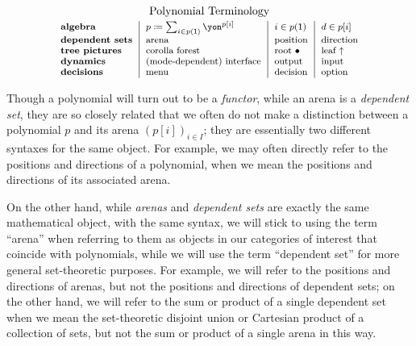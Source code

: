 \documentclass[Book-Poly]{subfiles}
\begin{document}
\begin{equation}%
\footnotesize
\begin{tabular}{l|l|l|l}
\multicolumn{4}{c}{\normalsize Polynomial Terminology}\\[3pt]
\textbf{algebra} & $p \coloneqq \sum_{i \in p(\1)} \yon^{p[i]}$ & $i \in p(\1)$ & $d \in p[i]$ \\
\textbf{dependent sets} & arena & position & direction \\
\textbf{tree pictures} & corolla forest & root $\bullet$ & leaf $\uparrow$ \\
\textbf{dynamics} & (mode-dependent) interface & output & input \\
\textbf{decisions} & menu & decision & option \\
\end{tabular}
\end{equation}

\begin{remark}
Though a polynomial will turn out to be a \emph{functor}, while an arena is a \emph{dependent set}, they are so closely related that we often do not make a distinction between a polynomial $p$ and its arena $(p[i])_{i \in I}$; they are essentially two different syntaxes for the same object.
For example, we may often directly refer to the positions and directions of a polynomial, when we mean the positions and directions of its associated arena.

On the other hand, while \emph{arenas} and \emph{dependent sets} are exactly the same mathematical object, with the same syntax, we will stick to using the term ``arena'' when referring to them as objects in our categories of interest that coincide with polynomials, while we will use the term ``dependent set'' for more general set-theoretic purposes.
For example, we will refer to the positions and directions of arenas, but not the positions and directions of dependent sets; on the other hand, we will refer to the sum or product of a single dependent set when we mean the set-theoretic disjoint union or Cartesian product of a collection of sets, but not the sum or product of a single arena in this way.
\end{remark}
\end{document}
